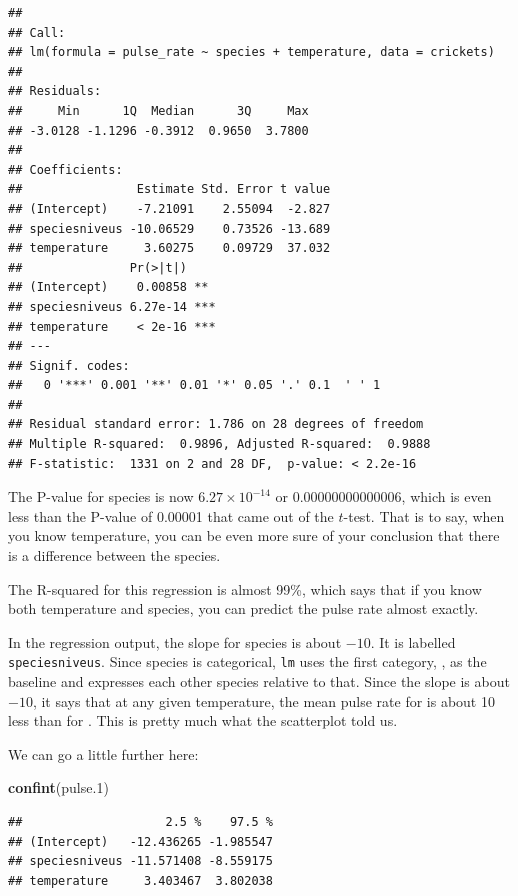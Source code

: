 \documentclass[]{tufte-book}
\newenvironment{Shaded}{}{}
\newcommand{\FloatTok}[1]{\textcolor[rgb]{0.25,0.63,0.44}{#1}}
\newcommand{\KeywordTok}[1]{\textcolor[rgb]{0.00,0.44,0.13}{\textbf{#1}}}
\newcommand{\NormalTok}[1]{#1}
\theoremstyle{definition}
\theoremstyle{definition}
\theoremstyle{definition}
\theoremstyle{remark}
\begin{document}
\begin{verbatim}
## 
## Call:
## lm(formula = pulse_rate ~ species + temperature, data = crickets)
## 
## Residuals:
##     Min      1Q  Median      3Q     Max 
## -3.0128 -1.1296 -0.3912  0.9650  3.7800 
## 
## Coefficients:
##                Estimate Std. Error t value
## (Intercept)    -7.21091    2.55094  -2.827
## speciesniveus -10.06529    0.73526 -13.689
## temperature     3.60275    0.09729  37.032
##               Pr(>|t|)    
## (Intercept)    0.00858 ** 
## speciesniveus 6.27e-14 ***
## temperature    < 2e-16 ***
## ---
## Signif. codes:  
##   0 '***' 0.001 '**' 0.01 '*' 0.05 '.' 0.1  ' ' 1
## 
## Residual standard error: 1.786 on 28 degrees of freedom
## Multiple R-squared:  0.9896, Adjusted R-squared:  0.9888 
## F-statistic:  1331 on 2 and 28 DF,  p-value: < 2.2e-16
\end{verbatim}

The P-value for species is now \(6.27\times 10^{-14}\) or
0.00000000000006, which is even less than the P-value of 0.00001 that
came out of the \(t\)-test. That is to say, when you know temperature,
you can be even more sure of your conclusion that there is a difference
between the species.

The R-squared for this regression is almost 99\%, which says that if you
know both temperature and species, you can predict the pulse rate almost
exactly.

In the regression output, the slope for species is about \(-10\). It is
labelled \texttt{speciesniveus}. Since species is categorical,
\texttt{lm} uses the first category, , as the
baseline and expresses each other species relative to that. Since the
slope is about \(-10\), it says that at any given temperature, the mean
pulse rate for  is about 10 less than for
. This is pretty much what the scatterplot told
us.

We can go a little further here:

\begin{Shaded}
\begin{Highlighting}[]
\KeywordTok{confint}\NormalTok{(pulse}\FloatTok{.1}\NormalTok{)}
\end{Highlighting}
\end{Shaded}

\begin{verbatim}
##                    2.5 %    97.5 %
## (Intercept)   -12.436265 -1.985547
## speciesniveus -11.571408 -8.559175
## temperature     3.403467  3.802038
\end{verbatim}
\end{document}
